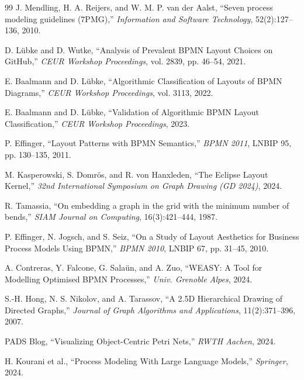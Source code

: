 \documentclass{article}
\begin{document}
\begin{thebibliography}{99}
		J. Mendling, H. A. Reijers, and W. M. P. van der Aalst, ``Seven process modeling guidelines (7PMG),'' \emph{Information and Software Technology}, 52(2):127--136, 2010.
		
		D. L\"ubke and D. Wutke, ``Analysis of Prevalent BPMN Layout Choices on GitHub,'' \emph{CEUR Workshop Proceedings}, vol. 2839, pp. 46--54, 2021.
		
		E. Baalmann and D. L\"ubke, ``Algorithmic Classification of Layouts of BPMN Diagrams,'' \emph{CEUR Workshop Proceedings}, vol. 3113, 2022.
		
		E. Baalmann and D. L\"ubke, ``Validation of Algorithmic BPMN Layout Classification,'' \emph{CEUR Workshop Proceedings}, 2023.
		
		P. Effinger, ``Layout Patterns with BPMN Semantics,'' \emph{BPMN 2011}, LNBIP 95, pp. 130--135, 2011.
		
		M. Kasperowski, S. Domr\"os, and R. von Hanxleden, ``The Eclipse Layout Kernel,'' \emph{32nd International Symposium on Graph Drawing (GD 2024)}, 2024.
		
		R. Tamassia, ``On embedding a graph in the grid with the minimum number of bends,'' \emph{SIAM Journal on Computing}, 16(3):421--444, 1987.
		
		P. Effinger, N. Jogsch, and S. Seiz, ``On a Study of Layout Aesthetics for Business Process Models Using BPMN,'' \emph{BPMN 2010}, LNBIP 67, pp. 31--45, 2010.
		
		A. Contreras, Y. Falcone, G. Sala\"un, and A. Zuo, ``WEASY: A Tool for Modelling Optimised BPMN Processes,'' \emph{Univ. Grenoble Alpes}, 2024.
		
		S.-H. Hong, N. S. Nikolov, and A. Tarassov, ``A 2.5D Hierarchical Drawing of Directed Graphs,'' \emph{Journal of Graph Algorithms and Applications}, 11(2):371--396, 2007.
		
		PADS Blog, ``Visualizing Object-Centric Petri Nets,'' \emph{RWTH Aachen}, 2024.
		
		H. Kourani et al., ``Process Modeling With Large Language Models,'' \emph{Springer}, 2024.
		
	\end{thebibliography}
	
\end{document}
